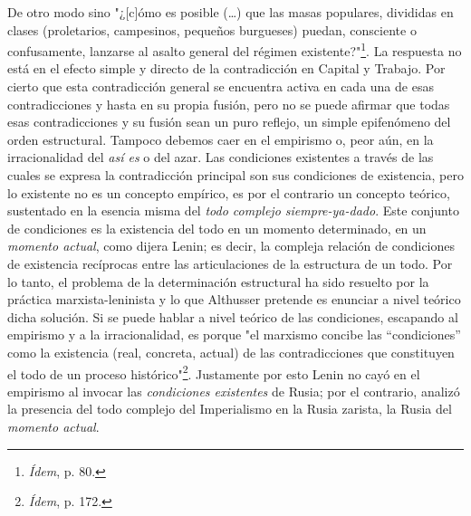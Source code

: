 \documentclass{book}
\begin{document}
De otro modo sino "¿{[}c{]}ómo es posible (\dots) que las masas
populares, divididas en clases (proletarios, campesinos, pequeños
burgueses) puedan, consciente o confusamente, lanzarse al asalto general
del régimen existente?"\footnote{\emph{Ídem}, p. 80.}. La respuesta no
está en el efecto simple y directo de la contradicción en Capital y
Trabajo. Por cierto que esta contradicción general se encuentra activa
en cada una de esas contradicciones y hasta en su propia fusión, pero no
se puede afirmar que todas esas contradicciones y su fusión sean un puro
reflejo, un simple epifenómeno del orden estructural. Tampoco debemos
caer en el empirismo o, peor aún, en la irracionalidad del \emph{así es}
o del azar. Las condiciones existentes a través de las cuales se expresa
la contradicción principal son sus condiciones de existencia, pero lo
existente no es un concepto empírico, es por el contrario un concepto
teórico, sustentado en la esencia misma del \emph{todo complejo
siempre-ya-dado}. Este conjunto de condiciones es la existencia del todo
en un momento determinado, en un \emph{momento actual}, como dijera
Lenin; es decir, la compleja relación de condiciones de existencia
recíprocas entre las articulaciones de la estructura de un todo. Por lo
tanto, el problema de la determinación estructural ha sido resuelto por
la práctica marxista-leninista y lo que Althusser pretende es enunciar a
nivel teórico dicha solución. Si se puede hablar a nivel teórico de las
condiciones, escapando al empirismo y a la irracionalidad, es porque "el
marxismo concibe las ``condiciones'' como la existencia (real, concreta,
actual) de las contradicciones que constituyen el todo de un proceso
histórico"\footnote{\emph{Ídem}, p. 172.}. Justamente por esto Lenin no
cayó en el empirismo al invocar las \emph{condiciones existentes} de
Rusia; por el contrario, analizó la presencia del todo complejo del
Imperialismo en la Rusia zarista, la Rusia del \emph{momento actual}.
\end{document}
